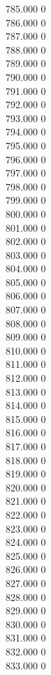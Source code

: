 { 785.000	0 \\
 786.000	0 \\
 787.000	0 \\
 788.000	0 \\
 789.000	0 \\
 790.000	0 \\
 791.000	0 \\
 792.000	0 \\
 793.000	0 \\
 794.000	0 \\
 795.000	0 \\
 796.000	0 \\
 797.000	0 \\
 798.000	0 \\
 799.000	0 \\
 800.000	0 \\
 801.000	0 \\
 802.000	0 \\
 803.000	0 \\
 804.000	0 \\
 805.000	0 \\
 806.000	0 \\
 807.000	0 \\
 808.000	0 \\
 809.000	0 \\
 810.000	0 \\
 811.000	0 \\
 812.000	0 \\
 813.000	0 \\
 814.000	0 \\
 815.000	0 \\
 816.000	0 \\
 817.000	0 \\
 818.000	0 \\
 819.000	0 \\
 820.000	0 \\
 821.000	0 \\
 822.000	0 \\
 823.000	0 \\
 824.000	0 \\
 825.000	0 \\
 826.000	0 \\
 827.000	0 \\
 828.000	0 \\
 829.000	0 \\
 830.000	0 \\
 831.000	0 \\
 832.000	0 \\
 833.000	0 \\
}
